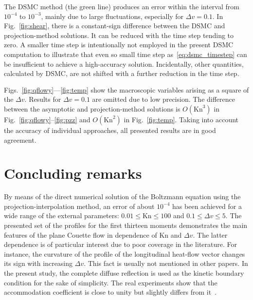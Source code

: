 \documentclass[review]{elsarticle}
\newcommand{\Kn}{\mathrm{Kn}}
\newcommand{\OO}[1]{O(#1)}
\begin{document}
The DSMC method (the green line) produces an error within the interval from \(10^{-4}\) to \(10^{-3}\),
mainly due to large fluctuations, especially for \(\Delta{v}=0.1\).
In Fig.~\ref{fig:shear}, there is a constant-sign difference
between the DSMC and projection-method solutions.
It can be reduced with the time step tending to zero.
A smaller time step is intentionally not employed in the present DSMC computation
to illustrate that even so small time step as~\eqref{eq:dsmc_timestep} can be insufficient
to achieve a high-accuracy solution.
Incidentally, other quantities, calculated by DSMC, are not shifted with
a further reduction in the time step.

Figs.~\ref{fig:qflowy}---\ref{fig:temp} show the macroscopic variables
arising as a square of the \(\Delta{v}\).
Results for \(\Delta{v}=0.1\) are omitted due to low precision.
The difference between the asymptotic and projection-method solutions
is \(\OO{\Kn^3}\) in Fig.~\ref{fig:qflowy}--\ref{fig:pzz} and \(\OO{\Kn^2}\) in Fig.~\ref{fig:temp}.
Taking into account the accuracy of individual approaches,
all presented results are in good agreement.

\section{Concluding remarks}

By means of the direct numerical solution of the Boltzmann equation using the projection-interpolation method,
an error of about \(10^{-4}\) has been achieved for a wide range of the external parameters:
\(0.01 \le \Kn \le 100\) and \(0.1 \le \Delta{v} \le 5\).
The presented set of the profiles for the first thirteen moments demonstrates
the main features of the plane Couette flow in dependence of \(\Kn\) and \(\Delta{v}\).
The latter dependence is of particular interest due to poor coverage in the literature.
For instance, the curvature of the profile of the longitudinal heat-flow vector
changes its sign with increasing \(\Delta{v}\).
This fact is usually not mentioned in other papers.
In the present study, the complete diffuse reflection is used as the kinetic boundary condition
for the sake of simplicity. The real experiments show that the accommodation coefficient
is close to unity but slightly differs from it~\citep{Agrawal2008}.
\end{document}
